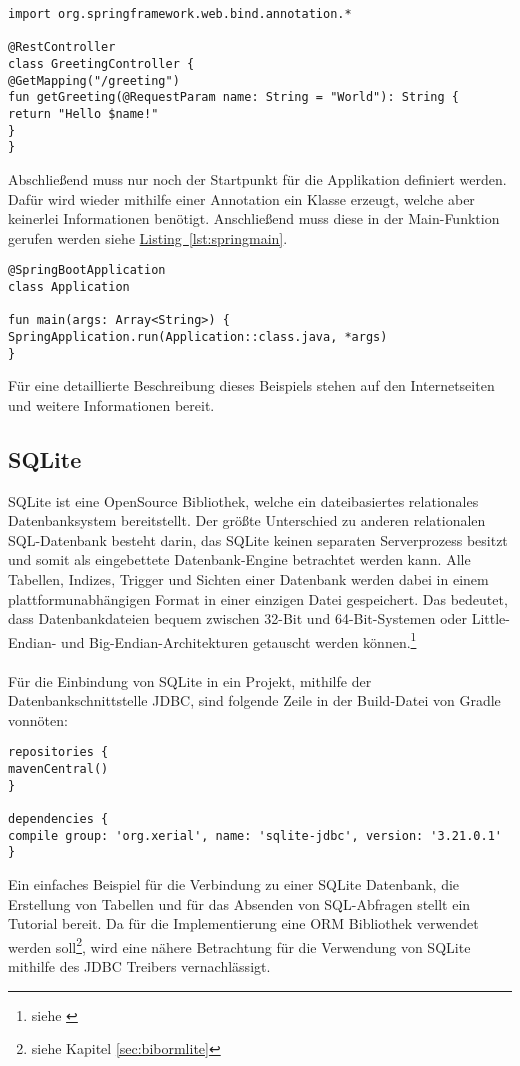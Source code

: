 \begin{lstlisting}[style=lstStyleFramed, caption={Beispiel: Spring Controller}, label=lst:springcontroller]
import org.springframework.web.bind.annotation.*

@RestController
class GreetingController {
@GetMapping("/greeting")
fun getGreeting(@RequestParam name: String = "World"): String {
return "Hello $name!"
}
}
\end{lstlisting}
Abschließend muss nur noch der Startpunkt für die Applikation definiert werden. Dafür wird wieder mithilfe einer Annotation ein Klasse erzeugt, welche aber keinerlei Informationen benötigt. Anschließend muss diese in der Main-Funktion gerufen werden siehe \hyperref[lst:springmain]{Listing~\ref{lst:springmain}}.
\begin{lstlisting}[style=lstStyleFramed, caption={Beispiel: Spring Application Class}, label=lst:springmain]
@SpringBootApplication
class Application

fun main(args: Array<String>) {
SpringApplication.run(Application::class.java, *args)
}
\end{lstlisting}
Für eine detaillierte Beschreibung dieses Beispiels stehen auf den Internetseiten \cite{springTutorialKotlin} und \cite{springTutorial} weitere Informationen bereit.

\subsection{SQLite}\label{sec:bibsqlite}
SQLite ist eine OpenSource Bibliothek, welche ein dateibasiertes relationales Datenbanksystem bereitstellt. Der größte Unterschied zu anderen relationalen SQL-Datenbank besteht darin, das SQLite keinen separaten Serverprozess besitzt und somit als eingebettete Datenbank-Engine betrachtet werden kann. Alle Tabellen, Indizes, Trigger und Sichten einer Datenbank werden dabei in einem plattformunabhängigen Format in einer einzigen Datei gespeichert. Das bedeutet, dass Datenbankdateien bequem zwischen 32-Bit und 64-Bit-Systemen oder Little-Endian- und Big-Endian-Architekturen getauscht werden können.\footnote{siehe \cite{sqliteAbout}}\\
\\
Für die Einbindung von SQLite in ein Projekt, mithilfe der Datenbankschnittstelle \gls{JDBC}, sind folgende Zeile in der Build-Datei von Gradle vonnöten:
\begin{lstlisting}[style=lstStyleFramed, caption={Einbindung der Bibliothek SQLite mithilfe von Gradle}]
repositories {
mavenCentral()
}

dependencies {
compile group: 'org.xerial', name: 'sqlite-jdbc', version: '3.21.0.1'
}
\end{lstlisting}
Ein einfaches Beispiel für die Verbindung zu einer SQLite Datenbank, die Erstellung von Tabellen und für das Absenden von SQL-Abfragen stellt \cite{sqliteJDBCTutorial} ein Tutorial bereit. Da für die Implementierung eine \gls{ORM} Bibliothek verwendet werden soll\footnote{siehe Kapitel \ref{sec:bibormlite}}, wird eine nähere Betrachtung für die Verwendung von SQLite mithilfe des \gls{JDBC} Treibers vernachlässigt.

